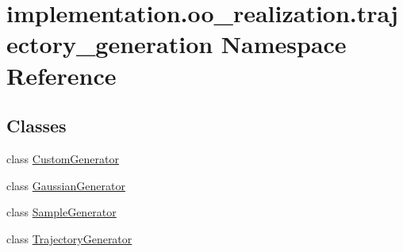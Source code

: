 \hypertarget{namespaceimplementation_1_1oo__realization_1_1trajectory__generation}{}\section{implementation.\+oo\+\_\+realization.\+trajectory\+\_\+generation Namespace Reference}
\label{namespaceimplementation_1_1oo__realization_1_1trajectory__generation}
\subsection*{Classes}
\begin{DoxyCompactItemize}
\item 
class \hyperlink{classimplementation_1_1oo__realization_1_1trajectory__generation_1_1_custom_generator}{Custom\+Generator}
\item 
class \hyperlink{classimplementation_1_1oo__realization_1_1trajectory__generation_1_1_gaussian_generator}{Gaussian\+Generator}
\item 
class \hyperlink{classimplementation_1_1oo__realization_1_1trajectory__generation_1_1_sample_generator}{Sample\+Generator}
\item 
class \hyperlink{classimplementation_1_1oo__realization_1_1trajectory__generation_1_1_trajectory_generator}{Trajectory\+Generator}
\end{DoxyCompactItemize}
